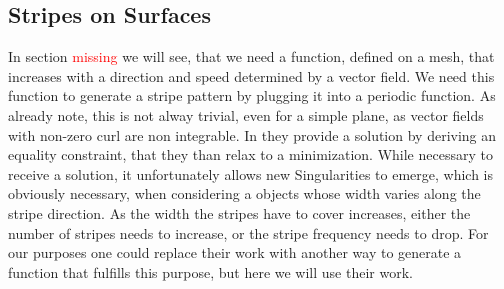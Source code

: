 \documentclass{utue} %
\begin{document}
\subsection{Stripes on Surfaces}
In section \textcolor{red}{missing} we will see, that we need a function, defined on a mesh, that increases with a direction and speed determined by a vector field. We need this function to generate a stripe pattern by plugging it into a periodic function. As \citeauthor{stripes} already note, this is not alway trivial, even for a simple plane, as vector fields with non-zero curl are non integrable. In \cite{stripes} they provide a solution by deriving an equality constraint, that they than relax to a minimization. While necessary to receive a solution, it unfortunately allows new Singularities to emerge, which is obviously necessary, when considering a objects whose width varies along the stripe direction. As the width the stripes have to cover increases, either the number of stripes needs to increase, or the stripe frequency needs to drop. For our purposes one could replace their work with another way to generate a function that fulfills this purpose, but here we will use their work.



\printbibliography
\end{document}
